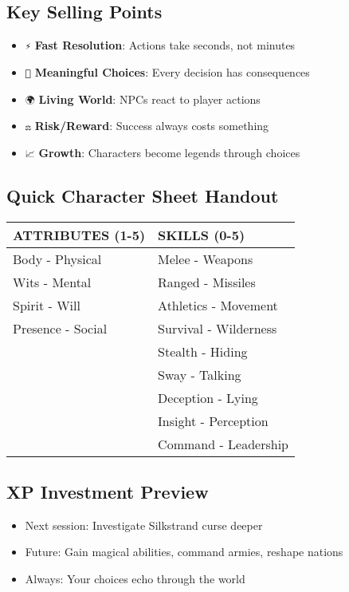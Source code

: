 \documentclass[12pt]{article}
\newcommand{\dice}[1]{\texttt{#1}}
\begin{document}
\subsection*{Key Selling Points}
\begin{itemize}
\item \dice{⚡} \textbf{Fast Resolution}: Actions take seconds, not minutes
\item \dice{🎲} \textbf{Meaningful Choices}: Every decision has consequences  
\item \dice{🌍} \textbf{Living World}: NPCs react to player actions
\item \dice{⚖️} \textbf{Risk/Reward}: Success always costs something
\item \dice{📈} \textbf{Growth}: Characters become legends through choices
\end{itemize}

\subsection*{Quick Character Sheet Handout}
\begin{center}
\begin{tabular}{|l|l|}
\hline
\textbf{ATTRIBUTES (1-5)} & \textbf{SKILLS (0-5)} \\
\hline
Body - Physical & Melee - Weapons \\
Wits - Mental & Ranged - Missiles \\  
Spirit - Will & Athletics - Movement \\
Presence - Social & Survival - Wilderness \\
& Stealth - Hiding \\
& Sway - Talking \\
& Deception - Lying \\
& Insight - Perception \\
& Command - Leadership \\
\hline
\end{tabular}
\end{center}

\subsection*{XP Investment Preview}
\begin{itemize}
\item Next session: Investigate Silkstrand curse deeper
\item Future: Gain magical abilities, command armies, reshape nations
\item Always: Your choices echo through the world
\end{itemize}
\end{document}
